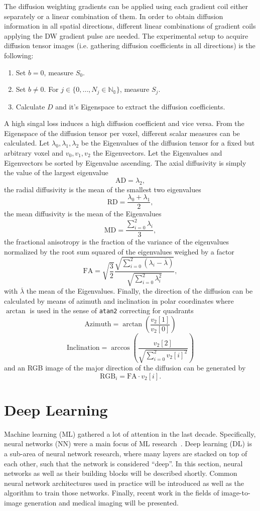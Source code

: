 The diffusion weighting gradients can be applied using each gradient coil either separately or a linear combination of them.
In order to obtain diffusion information in all spatial directions, different linear combinations of gradient coils applying the DW gradient pulse are needed.
The experimental setup to acquire diffusion tensor images (i.e. gathering diffusion coefficients in all directions) is the following:
\begin{enumerate}
 \item Set $b = 0$, measure $S_0$.
 \item Set $b \neq 0$. For $j \in \{0, \dots, N_j \in \mathbb{N_0}\}$, measure $S_j$.
 \item Calculate $D$ and it's Eigenspace to extract the diffusion coefficients.
\end{enumerate}
A high singal loss induces a high diffusion coefficient and vice versa.
From the Eigenspace of the diffusion tensor per voxel, different scalar measures can be calculated.
Let $\lambda_0, \lambda_1, \lambda_2$ be the Eigenvalues of the diffusion tensor for a fixed but arbitrary voxel and $v_0, v_1, v_2$ the Eigenvectors.
Let the Eigenvalues and Eigenvectors be sorted by Eigenvalue ascending.
The axial diffusivity is simply the value of the largest eigenvalue
\[ \text{AD} = \lambda_2, \]
the radial diffusivity is the mean of the smallest two eigenvalues
\[ \text{RD} = \frac{\lambda_0 + \lambda_1}{2}, \]
the mean diffusivity is the mean of the Eigenvalues
\[ \text{MD} = \frac{\sum_{i = 0}^2 \lambda_i}{3}, \]
the fractional anisotropy is the fraction of the variance of the eigenvalues normalized by the root sum squared of the eigenvalues weighed by a factor
\[ \text{FA} = \sqrt{\frac{3}{2}} \frac{ \sqrt{\sum_{i=0}^2 (\lambda_i - \overline{\lambda})} }{ \sqrt{\sum_{i=0}^2 \lambda_i^2} }, \]
with $\overline{\lambda}$ the mean of the Eigenvalues.
Finally, the direction of the diffusion can be calculated by means of azimuth and inclination in polar coordinates where $\arctan$ is used in the sense of \texttt{atan2} correcting for quadrants
\[ \text{Azimuth} =  \arctan\left(\frac{v_2[1]}{v_2[0]}\right) \]
\[ \text{Inclination} = \arccos\left(\frac{v_2[2]}{\sqrt{\sum_{i = 0}^2 v_2[i]^2}}\right) \]
and an RGB image of the major direction of the diffusion can be generated by
\[ \text{RGB}_i = \text{FA} \cdot v_2[i]. \]


\section{Deep Learning}
Machine learning (ML) gathered a lot of attention in the last decade.
Specifically, neural networks (NN) were a main focus of ML research~\autocite{vaswani_attention_2017, goodfellow_generative_2020, krizhevsky_imagenet_2012}.
Deep learning (DL) is a sub-area of neural network research, where many layers are stacked on top of each other, such that the network is considered ``deep''.
In this section, neural networks as well as their building blocks will be described shortly.
Common neural network architectures used in practice will be introduced as well as the algorithm to train those networks.
Finally, recent work in the fields of image-to-image generation and medical imaging will be presented.

